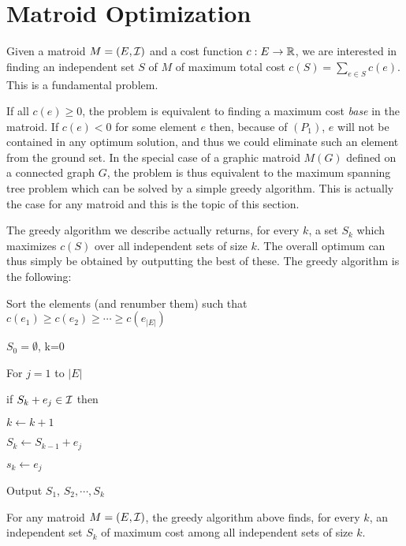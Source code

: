 \documentclass[12pt]{article}
\begin{document}
\section{Matroid Optimization}

Given a matroid $M=(E, {\cal I})$ and a cost function $c:E\rightarrow
{\mathbb R}$, we are interested in finding an independent set $S$ of $M$ of
maximum total cost $c(S)=\sum_{e\in S} c(e)$. This is a fundamental
problem. 

If all $c(e)\geq 0$, the problem is equivalent to finding a
maximum cost {\it base} in the matroid. If $c(e)<0$ for some element
$e$ then, because of $(P_1)$, $e$ will not be contained in any optimum
solution, and thus we could eliminate such an element from the ground
set.  In the special case of a graphic matroid $M(G)$ defined on a
connected graph $G$, the problem is thus equivalent to the maximum
spanning tree problem which can be solved by a simple greedy
algorithm. This is actually the case for any matroid and this is the
topic of this section. 

The greedy algorithm we describe actually returns, for every $k$, a
set $S_k$ which maximizes $c(S)$ over all independent sets of size
$k$. The overall optimum can thus simply be obtained by outputting the
best of these. The greedy algorithm is the following: 

\begin{pseudocode}
\item Sort the elements (and renumber them) such that $c(e_1)\geq
  c(e_2)\geq \cdots \geq c(e_{|E|})$
\item $S_0=\emptyset$, k=0
\item For $j=1$ to $|E|$
\begin{pseudocode}
\item
 if $S_{k}+e_j \in {\cal I}$ then
\begin{pseudocode}
\item
$k \leftarrow k+1$
\item
$S_k \leftarrow S_{k-1} + e_j$ 
\item $s_k \leftarrow e_j $
\end{pseudocode}
\end{pseudocode}
\item Output $S_1$, $S_2, \cdots, S_k$
\end{pseudocode}

\begin{theorem}
For any matroid $M=(E,{\cal I})$, the greedy algorithm above finds,
for every $k$,  an independent set $S_k$ of maximum cost among all
independent sets of size $k$.
\end{theorem}
\end{document}
